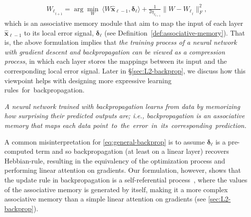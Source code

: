 \documentclass{article}
\newcommand{\citep}{\parencite}
\newcommand{\inner}[2]{\langle #1, #2 \rangle}
\newcommand{\head}[1]{\vspace{1.7mm}\noindent{{\textcolor{c4}{\bf #1.}}}}
\begin{document}
\begin{align}\label{eq:backprop-simple}
    {W_{\ell}}_{_{t+1}} = \arg \min_{W} \: \inner{W \hat{\boldsymbol{x}}_{\ell - 1}}{ \boldsymbol{\delta}_{\ell}} + \frac{1}{2 \eta_{\ell_{t+1}}}\| W - {W_{\ell}}_{_{t}} \|_F^{2}, 
\end{align}
which is an associative memory module that aim to map the input of each layer $\hat{\boldsymbol{x}}_{\ell - 1}$ to its local error signal, $\boldsymbol{\delta}_{\ell}$ (see Definition~\ref{def:associative-memory}). That is, the above formulation implies that \textit{the training process of a neural network with gradient descent and backpropagation can be viewed as a compression process}, in which each layer stores the mappings between its input and the corresponding local error signal. Later in \S\ref{sec:L2-backprop}, we discuss how this viewpoint helps with designing more expressive learning rules~for~backpropagation.  

\vspace{8pt}
 \begin{myboxi}
     \textit{A neural network trained with backpropagation learns from data by memorizing how surprising their predicted outputs are; i.e., backpropagation is an associative memory that maps each data point~to~the~error~in~its~corresponding~prediction. }
 \end{myboxi}

\head{Backpropagation $\neq$ Linear Attention} A common misinterpretation for \autoref{eq:general-backprop} is to assume $\boldsymbol{\delta}_{\ell}$ is a pre-computed term and so backpropagation (at least on a linear layer) recovers Hebbian-rule, resulting in the equivalency of the optimization process and performing linear attention on gradients. Our formulation, however, shows that the update rule in backpropagation is a self-referential process~\citep{schmidhuber1993self}, where the values of the associative memory is generated by itself, making it a more complex associative memory than a simple linear attention on gradients (see \autoref{sec:L2-backprop}).  
\end{document}
